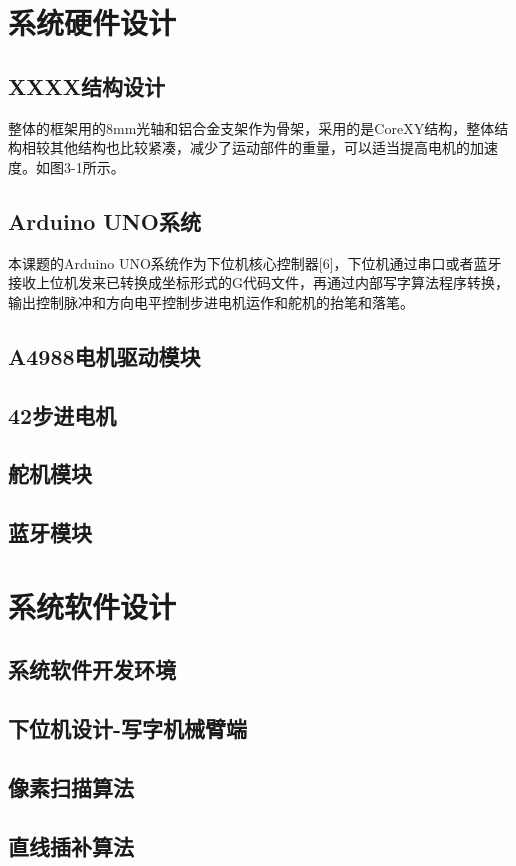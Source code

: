 \documentclass[twoside, fontset=windows]{ctexart}
\begin{document}
\section{系统硬件设计}
  \subsection{XXXX结构设计}
  整体的框架用的8mm光轴和铝合金支架作为骨架，采用的是CoreXY结构，整体结构相较其他结构也比较紧凑，减少了运动部件的重量，可以适当提高电机的加速度。如图3-1所示。
  \subsection{Arduino UNO系统}
  本课题的Arduino UNO系统作为下位机核心控制器[6]，下位机通过串口或者蓝牙接收上位机发来已转换成坐标形式的G代码文件，再通过内部写字算法程序转换，输出控制脉冲和方向电平控制步进电机运作和舵机的抬笔和落笔\cite{TXXB20260123004}。
  \subsection{A4988电机驱动模块}
  \subsection{42步进电机}
  \subsection{舵机模块}
  \subsection{蓝牙模块}
\section{系统软件设计}
  \subsection{系统软件开发环境}
  \subsection{下位机设计-写字机械臂端}
  \subsection{像素扫描算法}
  \subsection{直线插补算法}


\nocite{*}
\printbibliography[title=参考文献, heading=bibintoc]
\end{document}
